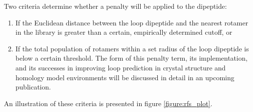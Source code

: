 Two criteria determine whether a penalty will be applied to the dipeptide: 
\begin{enumerate}
\item If the Euclidean distance between the loop dipeptide and the nearest rotamer in the library is greater than a certain, empirically determined cutoff, or
\item If the total population of rotamers within a set radius of the loop dipeptide is below a certain threshold.
The form of this penalty term, its implementation, and its successes in improving loop prediction in crystal structure and homology model environments will be discussed in detail in an upcoming publication.
\end{enumerate}
An illustration of these criteria is presented in figure \ref{figure:rfs_plot}.
